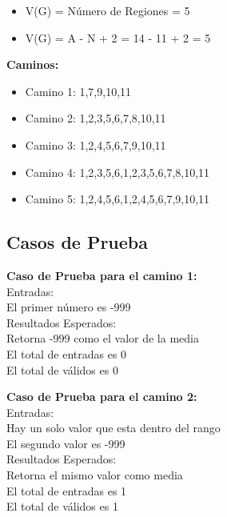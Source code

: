 \documentclass[a4paper,12pt]{article}
\begin{document}
\begin{itemize}
 \item V(G) = Número de Regiones = 5
 \item V(G) = A - N + 2 = 14 - 11 + 2 = 5
\end{itemize}
\textbf{Caminos:}

\begin{itemize}
 \item Camino 1: 1,7,9,10,11
 \item Camino 2: 1,2,3,5,6,7,8,10,11
 \item Camino 3: 1,2,4,5,6,7,9,10,11
 \item Camino 4: 1,2,3,5,6,1,2,3,5,6,7,8,10,11
 \item Camino 5: 1,2,4,5,6,1,2,4,5,6,7,9,10,11
\end{itemize}

\subsection{Casos de Prueba}

\textbf{Caso de Prueba para el camino 1:} \\
Entradas: \\
\hspace*{1cm} El primer número es -999 \\
Resultados Esperados: \\
\hspace*{1cm} Retorna -999 como el valor de la media \\
\hspace*{1cm} El total de entradas es 0 \\
\hspace*{1cm} El total de válidos es 0 \par

\textbf{Caso de Prueba para el camino 2:} \\
Entradas: \\
\hspace*{1cm} Hay un solo valor que esta dentro del rango \\
\hspace*{1cm} El segundo valor es -999 \\
Resultados Esperados: \\
\hspace*{1cm} Retorna el mismo valor como media \\
\hspace*{1cm} El total de entradas es 1 \\
\hspace*{1cm} El total de válidos es 1 \par
\end{document}
